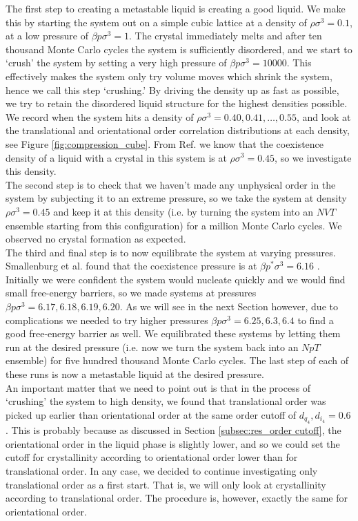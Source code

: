 \documentclass[thesis]{subfiles}
\begin{document}
The first step to creating a metastable liquid is creating a good liquid. We make this by starting the system out on a simple cubic lattice at a density of $\rho \sigma^3 = 0.1$, at a low pressure of $\beta p \sigma^3 = 1$. The crystal immediately melts and after ten thousand Monte Carlo cycles the system is sufficiently disordered, and we start to `crush' the system by setting a very high pressure of $\beta p \sigma^3 = 10000$. This effectively makes the system only try volume moves which shrink the system, hence we call this step `crushing.' By driving the density up as fast as possible, we try to retain the disordered liquid structure for the highest densities possible. We record when the system hits a density of $\rho \sigma^3 = 0.40, 0.41, \ldots , 0.55$, and look at the translational and orientational order correlation distributions at each density, see Figure \ref{fig:compression_cube}. From Ref. \cite{smallenburg2012vacancy} we know that the coexistence density of a liquid with a crystal in this system is at $\rho \sigma^3 = 0.45$, so we investigate this density.\\
The second step is to check that we haven't made any unphysical order in the system by subjecting it to an extreme pressure, so we take the system at density $\rho \sigma^3 = 0.45$ and keep it at this density (i.e. by turning the system into an $NVT$ ensemble starting from this configuration) for a million Monte Carlo cycles. We observed no crystal formation as expected.\\
The third and final step is to now equilibrate the system at varying pressures. Smallenburg et al. found that the coexistence pressure is at $\beta p^* \sigma^3 = 6.16$ \cite{smallenburg2012vacancy}. Initially we were confident the system would nucleate quickly and we would find small free-energy barriers, so we made systems at pressures $\beta p \sigma^3 = 6.17, 6.18, 6.19, 6.20$. As we will see in the next Section however, due to complications we needed to try higher pressures $\beta p \sigma^3 = 6.25, 6.3, 6.4$ to find a good free-energy barrier as well. We equilibrated these systems by letting them run at the desired pressure (i.e. now we turn the system back into an $NpT$ ensemble) for five hundred thousand Monte Carlo cycles. The last step of each of these runs is now a metastable liquid at the desired pressure.\\

An important matter that we need to point out is that in the process of `crushing' the system to high density, we found that translational order was picked up earlier than orientational order at the same order cutoff of $d_{q_4}, d_{i_4} = 0.6$. This is probably because as discussed in Section \ref{subsec:res_order cutoff}, the orientational order in the liquid phase is slightly lower, and so we could set the cutoff for crystallinity according to orientational order lower than for translational order. In any case, we decided to continue investigating only translational order as a first start. That is, we will only look at crystallinity according to translational order. The procedure is, however, exactly the same for orientational order.
\end{document}

